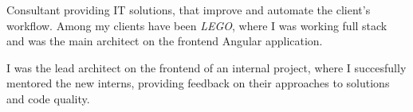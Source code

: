 Consultant providing IT solutions, that improve and automate the client's
workflow. Among my clients have been \emph{LEGO}, where I was working full stack
and was the main architect on the frontend Angular application.

\medskip

I was the lead architect on the frontend of an internal project, where I
succesfully mentored the new interns, providing feedback on their approaches to
solutions and code quality.

%

